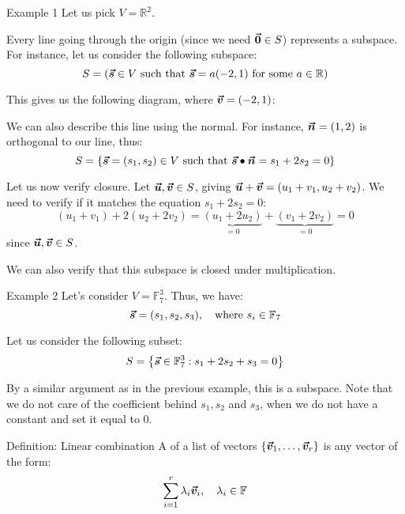 \documentclass[a4paper]{article}
\begin{document}
\begin{parag}{Example 1}
    Let us pick $V = \mathbb{R}^2$.

    Every line going through the origin (since we need $\bm{\protect\vec{0}} \in S$) represents a subspace. For instance, let us consider the following subspace:
    \[S = \left(\bvec{s} \in V \text{ such that } \bvec{s} = a\left(-2, 1\right) \text{ for some } a \in \mathbb{R}\right)\]

    This gives us the following diagram, where $\bvec{v} = \left(-2, 1\right)$:

    We can also describe this line using the normal. For instance, $\bvec{n} = \left(1, 2\right)$ is orthogonal to our line, thus: 
    \[S = \left\{\bvec{s} = \left(s_1, s_2\right) \in V \text{ such that } \bvec{s} \dotprod \bvec{n} = s_1 + 2s_2 = 0\right\}\]

    Let us now verify closure. Let $\bm{\protect\vec{u}}, \bm{\protect\vec{v}} \in S$, giving $\bvec{u} + \bvec{v} = \left(u_1 + v_1, u_2 + v_2\right)$. We need to verify if it matches the equation $s_1 + 2s_2 = 0$: 
    \[\left(u_1 + v_1\right) + 2\left(u_2 + 2v_2\right) = \underbrace{\left(u_1 + 2u_2\right)}_{= 0} + \underbrace{\left(v_1 + 2v_2\right)}_{= 0} = 0\]
    since $\bm{\protect\vec{u}}, \bm{\protect\vec{v}} \in S$.

    We can also verify that this subspace is closed under multiplication.
\end{parag}

\begin{parag}{Example 2}
    Let's consider $V = \mathbb{F}_7^3$. Thus, we have: 
    \[\bvec{s} = \left(s_1, s_2, s_3\right), \mathspace \text{where } s_i \in \mathbb{F}_7\]
    
    Let us consider the following subset: 
    \[S = \left\{\bvec{s} \in \mathbb{F}_7^3 : s_1 + 2s_2 + s_3 = 0\right\}\]
    
    By a similar argument as in the previous example, this is a subspace. Note that we do not care of the coefficient behind $s_1, s_2$ and $s_3$, when we do not have a constant and set it equal to 0.
\end{parag}

\begin{parag}{Definition: Linear combination}
    A  of a list of vectors $\left\{\bvec{v}_1, \ldots, \bvec{v}_r\right\}$ is any vector of the form: 
    \[\sum_{i=1}^{r} \lambda_i \bm{\protect\vec{v}}_i, \quad \lambda_i \in \mathbb{F}\]
    
\end{parag}
\end{document}
